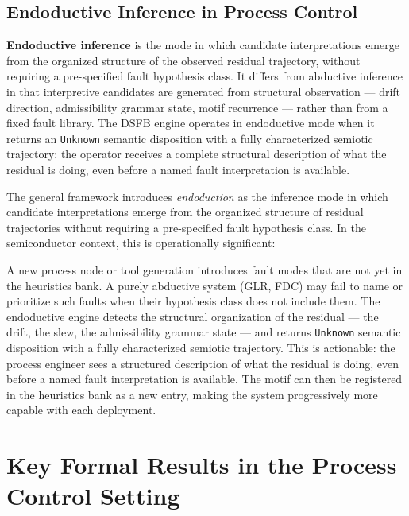 \documentclass[11pt,letterpaper]{article}
\theoremstyle{scresult}
\begin{document}
\subsection{Endoductive Inference in Process Control}

\begin{tcolorbox}[claimbox]
\textbf{Endoductive inference} is the mode in which candidate interpretations
emerge from the organized structure of the observed residual trajectory, without
requiring a pre-specified fault hypothesis class. It differs from abductive
inference in that interpretive candidates are generated from structural
observation --- drift direction, admissibility grammar state, motif recurrence
--- rather than from a fixed fault library. The DSFB engine operates in
endoductive mode when it returns an \texttt{Unknown} semantic disposition with a
fully characterized semiotic trajectory: the operator receives a complete
structural description of what the residual is doing, even before a named fault
interpretation is available.
\end{tcolorbox}

The general framework introduces \emph{endoduction} as the inference mode in
which candidate interpretations emerge from the organized structure of residual
trajectories without requiring a pre-specified fault hypothesis class. In the
semiconductor context, this is operationally significant:

A new process node or tool generation introduces fault modes that are not yet
in the heuristics bank. A purely abductive system (GLR, FDC) may fail to name
or prioritize such faults when their hypothesis class does not include them. The
endoductive engine detects the structural organization of the residual ---
the drift, the slew, the admissibility grammar state --- and returns
\texttt{Unknown} semantic disposition with a fully characterized semiotic
trajectory. This is actionable: the process engineer sees a structured
description of what the residual is doing, even before a named fault
interpretation is available. The motif can then be registered in the heuristics
bank as a new entry, making the system progressively more capable with each
deployment.

\section{Key Formal Results in the Process Control Setting}
\label{sec:formal}
\end{document}
